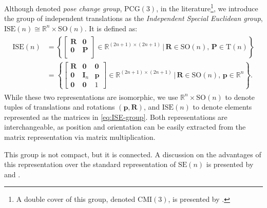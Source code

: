 \begin{example}\label{ex:independent-translation-rotation-ISE}
    Although denoted \emph{pose change group}, $\text{PCG}(3)$, \citep{Chirikjian2018} in the literature\footnote{A double cover of this group, denoted $\text{CMI}(3)$, is presented by \citet{Adorno2017}.}, we introduce the group of independent translations as the \emph{Independent Special Euclidean group}, $\text{ISE}(n)\cong\mathbb{R}^n\times\text{SO}(n)$. It is defined as:
    \begin{align}
        \begin{split}
            \text{ISE}(n) &= \left\{\begin{bmatrix}
            \mathbf{R} & \mathbf{0}\\
            \mathbf{0} & \mathbf{P}\\
            \end{bmatrix}\in\mathbb{R}^{(2n+1)\times(2n+1)}\,\biggl|\, \mathbf{R}\in\text{SO}(n),\,\mathbf{P}\in\text{T}(n)\right\}\\
            &= \left\{\begin{bmatrix}
            \mathbf{R} & \mathbf{0} & \mathbf{0}\\
            \mathbf{0} & \mathbf{I}_n & \mathbf{p}\\
            \mathbf{0} & \mathbf{0} & 1
            \end{bmatrix}\in\mathbb{R}^{(2n+1)\times(2n+1)}\,\Biggl|\, \mathbf{R}\in\text{SO}(n),\,\mathbf{p}\in\mathbb{R}^n\right\}.
        \end{split} \label{eq:ISE-group}
    \end{align}
    While these two representations are isomorphic, we use $\mathbb{R}^n\times \text{SO}(n)$ to denote tuples of translations and rotations $(\mathbf{p},\mathbf{R})$, and $\text{ISE}(n)$ to denote elements represented as the matrices in \eqref{eq:ISE-group}. Both representations are interchangeable, as position and orientation can be easily extracted from the matrix representation via matrix multiplication.

    This group is not compact, but it is connected. A discussion on the advantages of this representation over the standard representation of $\text{SE}(n)$ is presented by \citet{Adorno2017} and \citet{Chirikjian2018}. 
\end{example}
